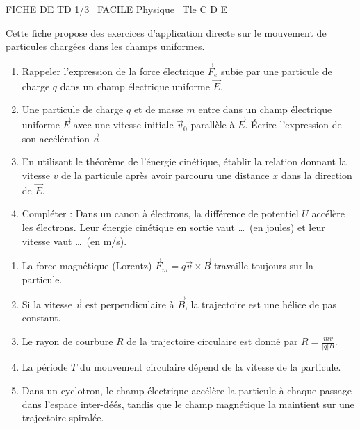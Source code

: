 \documentclass[11pt]{article}
\begin{document}
\begin{tcolorbox}[enhanced,colback=popink,colframe=popink,arc=10pt,boxrule=0pt,left=12pt,right=12pt,top=9pt,bottom=9pt]
{\color{white}\popxbold\small FICHE DE TD 1/3 \textbullet\ FACILE \hfill Physique \textbullet\ Tle C D E\par}
\end{tcolorbox}
\vspace{4pt}
Cette fiche propose des exercices d'application directe sur le mouvement de particules chargées dans les champs uniformes.

\begin{exercice}
\begin{enumerate}
    \item Rappeler l'expression de la force électrique $\vec{F}_e$ subie par une particule de charge $q$ dans un champ électrique uniforme $\vec{E}$.
    \item Une particule de charge $q$ et de masse $m$ entre dans un champ électrique uniforme $\vec{E}$ avec une vitesse initiale $\vec{v}_0$ parallèle à $\vec{E}$. Écrire l'expression de son accélération $\vec{a}$.
    \item En utilisant le théorème de l'énergie cinétique, établir la relation donnant la vitesse $v$ de la particule après avoir parcouru une distance $x$ dans la direction de $\vec{E}$.
    \item Compléter : Dans un canon à électrons, la différence de potentiel $U$ accélère les électrons. Leur énergie cinétique en sortie vaut \ldots\ (en joules) et leur vitesse vaut \ldots\ (en m/s).
\end{enumerate}
\end{exercice}

\begin{exercice}
\begin{enumerate}
    \item La force magnétique (Lorentz) $\vec{F}_m = q\vec{v} \times \vec{B}$ travaille toujours sur la particule.
    \item Si la vitesse $\vec{v}$ est perpendiculaire à $\vec{B}$, la trajectoire est une hélice de pas constant.
    \item Le rayon de courbure $R$ de la trajectoire circulaire est donné par $R = \frac{mv}{|q|B}$.
    \item La période $T$ du mouvement circulaire dépend de la vitesse de la particule.
    \item Dans un cyclotron, le champ électrique accélère la particule à chaque passage dans l'espace inter-déés, tandis que le champ magnétique la maintient sur une trajectoire spiralée.
\end{enumerate}
\end{exercice}
\end{document}
